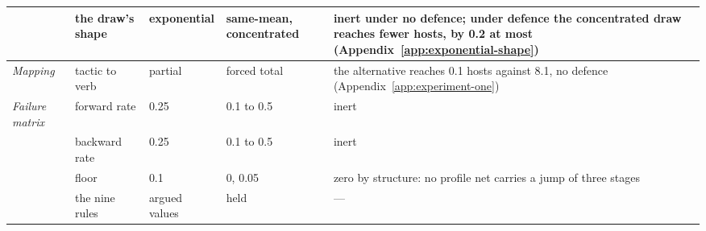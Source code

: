 \begin{table}[H]
\begin{tabular}{@{}P{1.6cm}P{2.8cm}P{1.9cm}P{2.5cm}P{6.4cm}@{}}
     & the draw's shape & exponential & same-mean, concentrated & inert under no defence; under defence the concentrated draw reaches fewer hosts, by 0.2 at most (Appendix~\ref{app:exponential-shape}) \\
    \midrule
    \emph{Mapping} & tactic to verb & partial & forced total & the alternative reaches 0.1 hosts against 8.1, no defence (Appendix~\ref{app:experiment-one}) \\
    \midrule
    \emph{Failure matrix} & forward rate & 0.25 & 0.1 to 0.5 & inert \\
     & backward rate & 0.25 & 0.1 to 0.5 & inert \\
     & floor & 0.1 & 0, 0.05 & zero by structure: no profile net carries a jump of three stages \\
     & the nine rules & argued values & held & --- \\
    \bottomrule
  \end{tabular}
\end{table}
